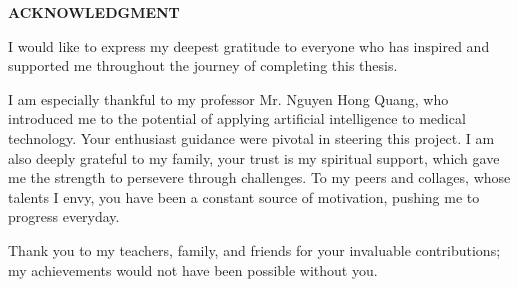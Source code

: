 \documentclass[../main.tex]{subfiles}
\begin{document}
\begin{center}
    \Large{\textbf{ACKNOWLEDGMENT}}\\
\end{center}
\vspace{1cm}
\par I would like to express my deepest gratitude to everyone who has inspired and supported me throughout the journey of completing this thesis.

\par I am especially thankful to my professor Mr. Nguyen Hong Quang, who introduced me to the potential of applying artificial intelligence to medical technology.
Your enthusiast guidance  were pivotal in steering this project.
I am also deeply grateful to my family, your trust is my spiritual support, which gave me the strength to persevere through challenges.
To my peers and collages, whose talents I envy, you have been a constant source of motivation, pushing me to progress everyday.

\par Thank you to my teachers, family, and friends for your invaluable contributions; my achievements would not have been possible without you.
\end{document}
